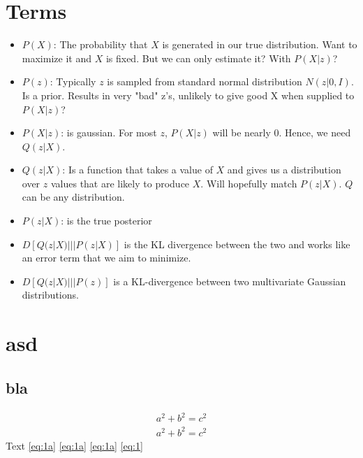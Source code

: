 \section{Terms}
\begin{itemize}
    \item $P(X)$: The probability that $X$ is generated in our true distribution. Want to maximize it and $X$ is fixed. But we can only estimate it? With $P(X|z)$?
    \item $P(z)$: Typically $z$ is sampled from standard normal distribution $N(z|0, I)$. Is a prior. Results in very "bad" z's, unlikely to give good X when supplied to $P(X|z)$?
    \item $P(X|z)$: is gaussian. For most $z$, $P(X|z)$ will be nearly 0. Hence, we need $Q(z|X)$. 
    \item $Q(z|X)$: Is a function that takes a value of $X$ and gives us a distribution over $z$ values that are likely to produce $X$. Will hopefully match $P(z|X)$. $Q$ can be any distribution.
    \item $P(z|X) $: is the true posterior
    \item $D[Q(z|X)|||P(z|X)]$ is the KL divergence between the two and works like an error term that we aim to minimize. 
    \item $D[Q(z|X)|||P(z)]$ is a KL-divergence between two multivariate Gaussian distributions.
\end{itemize}

\section{asd}
\subsection{bla}

\begin{subequations}\label{eq:1}
\begin{align} 
 a^2+b^2=c^2\label{eq:1a} \\
 a^2+b^2=c^2\label{eq:1b} 
\end{align}
\end{subequations}
Text \eqref{eq:1a} \autoref{eq:1a} \ref{eq:1a} \autoref{eq:1}

\newpage
